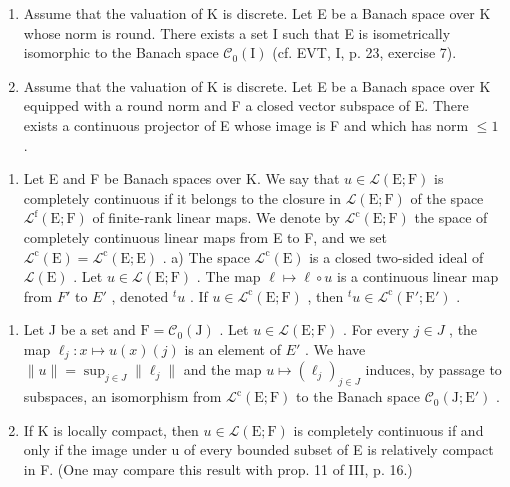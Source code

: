 \begin{enumerate}
\def\labelenumi{\alph{enumi})}
\setcounter{enumi}{4}
\item
  Assume that the valuation of K is discrete. Let E be a Banach space over K whose norm is round. There exists a set I such that E is isometrically isomorphic to the Banach space \(\mathcal{C}_{0}(\mathrm{I})\) (cf. EVT, I, p. 23, exercise 7).
\item
  Assume that the valuation of K is discrete. Let E be a Banach space over K equipped with a round norm and F a closed vector subspace of E. There exists a continuous projector of E whose image is F and which has norm \(\leqslant 1\) .
\end{enumerate}

\begin{enumerate}
\def\labelenumi{\arabic{enumi})}
\setcounter{enumi}{1}
\tightlist
\item
  Let E and F be Banach spaces over K. We say that \(u \in \mathcal{L}(\mathrm{E};\mathrm{F})\) is completely continuous if it belongs to the closure in \(\mathcal{L}(\mathrm{E};\mathrm{F})\) of the space \(\mathcal{L}^{\mathrm{f}}(\mathrm{E};\mathrm{F})\) of finite-rank linear maps. We denote by \(\mathcal{L}^{\mathrm{c}}(\mathrm{E};\mathrm{F})\) the space of completely continuous linear maps from E to F, and we set \(\mathcal{L}^{\mathrm{c}}(\mathrm{E}) = \mathcal{L}^{\mathrm{c}}(\mathrm{E};\mathrm{E})\) . a) The space \(\mathcal{L}^{\mathrm{c}}(\mathrm{E})\) is a closed two-sided ideal of \(\mathcal{L}(\mathrm{E})\) . Let \(u \in \mathcal{L}(\mathrm{E};\mathrm{F})\) . The map \(\ell \mapsto \ell \circ u\) is a continuous linear map from \(F'\) to \(E'\) , denoted \({}^{t}u\) . If \(u \in \mathcal{L}^{\mathrm{c}}(\mathrm{E};\mathrm{F})\) , then \({}^{t}u \in \mathcal{L}^{\mathrm{c}}(\mathrm{F}'; \mathrm{E}')\) .
\end{enumerate}

\begin{enumerate}
\def\labelenumi{\alph{enumi})}
\setcounter{enumi}{1}
\item
  Let J be a set and \(\mathrm{F} = \mathcal{C}_{0}(\mathrm{J})\) . Let \(u \in \mathcal{L}(\mathrm{E};\mathrm{F})\) . For every \(j \in J\) , the map \(\ell_{j} \colon x \mapsto u(x)(j)\) is an element of \(E'\) . We have \(\|u\| = \sup_{j \in J} \| \ell_{j} \|\) and the map \(u \mapsto (\ell_{j})_{j \in J}\) induces, by passage to subspaces, an isomorphism from \(\mathcal{L}^{\mathrm{c}}(\mathrm{E};\mathrm{F})\) to the Banach space \(\mathcal{C}_{0}(\mathrm{J};\mathrm{E}')\) .
\item
  If K is locally compact, then \(u \in \mathcal{L}(\mathrm{E}; \mathrm{F})\) is completely continuous if and only if the image under u of every bounded subset of E is relatively compact in F. (One may compare this result with prop. 11 of III, p. 16.)
\end{enumerate}

